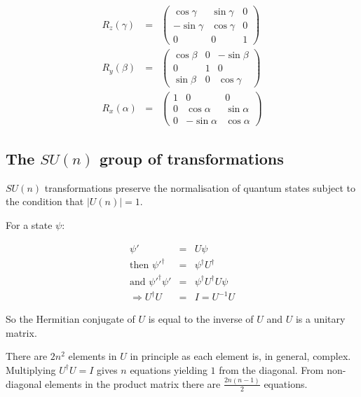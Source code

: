 \begin{eqnarray*}
  R_z(\gamma) & = &
  \left(
  \begin{array}{ccc}
    \cos\gamma  & \sin\gamma & 0 \\
    -\sin\gamma & \cos\gamma & 0 \\
    0 & 0 & 1
  \end{array}
  \right)
  \\
  R_y(\beta) & = &
  \left(
  \begin{array}{ccc}
    \cos\beta  & 0 & -\sin\beta \\
    0 & 1 & 0 \\
    \sin\beta  & 0 & \cos\gamma
  \end{array}
  \right)
  \\
  R_x(\alpha) & = &
  \left(
  \begin{array}{ccc}
    1 & 0 & 0 \\
    0 & \cos\alpha  & \sin\alpha \\
    0 & -\sin\alpha & \cos\alpha
  \end{array}
  \right)
\end{eqnarray*}

\subsection{The \texorpdfstring{$SU(n)$}{SUN} group of transformations}

$SU(n)$ transformations preserve the normalisation of quantum states subject to the condition that $|U(n)| = 1$.

For a state $\psi:$

\begin{eqnarray*}
  \psi' & = & U\psi \\
  \textrm{then } \psi'^{\dagger} & = & \psi^{\dagger}U^{\dagger} \\
  \textrm{and }  \psi'^{\dagger}\psi' & = & \psi^{\dagger}U^{\dagger}U\psi \\
  \Rightarrow U^{\dagger}U & = & I = U^{-1}U
\end{eqnarray*}

So the Hermitian conjugate of $U$ is equal to the inverse of $U$ and $U$ is a unitary matrix.

There are $2n^2$ elements in $U$ in principle as each element is, in general, complex.  Multiplying $U^{\dagger}U = I$ gives $n$ equations yielding $1$ from the diagonal.  From non-diagonal elements in the product matrix there are $\frac{2n(n-1)}{2}$ equations.

